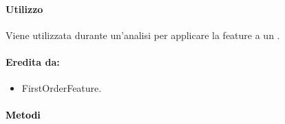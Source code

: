 \paragraph{Utilizzo\\} Viene utilizzata durante un'analisi per applicare la feature\g{} a un \dataset{}.

\paragraph{Eredita da:}
\begin{itemize}
	\item FirstOrderFeature.
\end{itemize}


\paragraph{\textcolor{black}{Metodi\\}}
